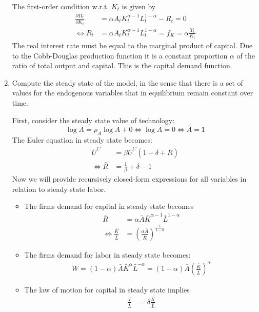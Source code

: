 \documentclass[a4paper]{scrartcl}
\begin{document}
\begin{enumerate}
\begin{solution}
		The first-order condition w.r.t. $K_{t}$ is given by
		\begin{align*}
		\frac{\partial \Pi_t}{\partial K_{t}} &= \alpha A_t K_t^{\alpha-1} L_t^{1-\alpha} - R_t = 0\\
		\Leftrightarrow R_t &= \alpha A_t K_t^{\alpha-1} L_t^{1-\alpha} = f_K = \alpha \frac{Y_t}{K_t}
		\end{align*}
		The real interest rate must be equal to the marginal product of capital. Due to the Cobb-Douglas production function it is a constant proportion $\alpha$ of the ratio of total output and capital. This is the capital demand function.
		\end{solution}
		\item Compute the steady state of the model, in the sense that there is a set of values for the endogenous variables that in equilibrium remain constant over time.
		\begin{solution}
		First, consider the steady state value of technology: 
		$$\log\bar{A}=\rho_A \log\bar{A} + 0 \Leftrightarrow \log\bar{A} = 0 \Leftrightarrow \bar{A} = 1$$ 
		The Euler equation in steady state becomes:
		\begin{align*}
			\bar{U}^C &= \beta \bar{U}^C(1-\delta+\bar{R})\\
			\Leftrightarrow \bar{R} &= \frac{1}{\beta} + \delta - 1
		\end{align*}
		Now we will provide recursively closed-form expressions for all variables in relation to steady state labor.
		\begin{itemize}
		\item The firms demand for capital in steady state becomes
		\begin{align*}
			\bar{R} &= \alpha \bar{A} \bar{K}^{\alpha-1}\bar{L}^{1-\alpha}\\
			\Leftrightarrow \frac{\bar{K}}{\bar{L}} &= \left(\frac{\alpha \bar{A}}{\bar{R}}\right)^{\frac{1}{1-\alpha}}
		\end{align*}
		\item The firms demand for labor in steady state becomes:
		\begin{align*}
			W =(1-\alpha) \bar{A}\bar{K}^\alpha \bar{L}^{-\alpha} = (1-\alpha)\bar{A} \left(\frac{\bar{K}}{\bar{L}}\right)^\alpha
		\end{align*}
		\item The law of motion for capital in steady state implies
		\begin{align*}
			\frac{\bar{I}}{\bar{L}} &= \delta\frac{\bar{K}}{\bar{L}}
		\end{align*}

\end{itemize}
\end{solution}
\end{enumerate}
\end{document}
